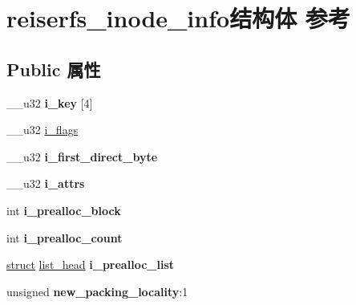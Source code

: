 \hypertarget{structreiserfs__inode__info}{}\section{reiserfs\+\_\+inode\+\_\+info结构体 参考}
\label{structreiserfs__inode__info}
\subsection*{Public 属性}
\begin{DoxyCompactItemize}
\item 
\mbox{\label{structreiserfs__inode__info_adee78f440abcf3b25e3b3dcc3d5da332}} 
\+\_\+\+\_\+u32 {\bfseries i\+\_\+key} \mbox{[}4\mbox{]}
\item 
\+\_\+\+\_\+u32 \hyperlink{structreiserfs__inode__info_a08045363dd99c56bf8a7b66697898e7c}{i\+\_\+flags}
\item 
\mbox{\label{structreiserfs__inode__info_ae4a8d0bd6710a283584f657be4eeca02}} 
\+\_\+\+\_\+u32 {\bfseries i\+\_\+first\+\_\+direct\+\_\+byte}
\item 
\mbox{\label{structreiserfs__inode__info_a242e3200b7b8d64c221c38452017a6e6}} 
\+\_\+\+\_\+u32 {\bfseries i\+\_\+attrs}
\item 
\mbox{\label{structreiserfs__inode__info_aad8e400d8cd5866bedaade711ced03f9}} 
int {\bfseries i\+\_\+prealloc\+\_\+block}
\item 
\mbox{\label{structreiserfs__inode__info_ab7e656b6991c4ced1deabc8c8d4193e4}} 
int {\bfseries i\+\_\+prealloc\+\_\+count}
\item 
\mbox{\label{structreiserfs__inode__info_ab40cf95011bc71b40236e0fb583f0fa1}} 
\hyperlink{interfacestruct}{struct} \hyperlink{structlist__head}{list\+\_\+head} {\bfseries i\+\_\+prealloc\+\_\+list}
\item 
\mbox{\label{structreiserfs__inode__info_a21435b7e15f15807ab5e5a586f0b4bf0}} 
unsigned {\bfseries new\+\_\+packing\+\_\+locality}\+:1
\item 

\end{DoxyCompactItemize}
